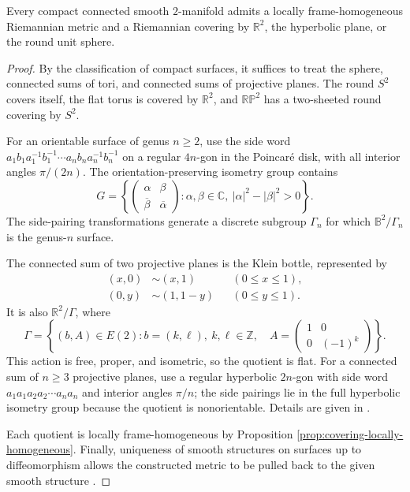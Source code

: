 \begin{theorem}
\label{thm:uniformization-compact-surfaces}
Every compact connected smooth $2$-manifold admits a locally
frame-homogeneous Riemannian metric and a Riemannian covering by
$\mathbb R^2$, the hyperbolic plane, or the round unit sphere.
\end{theorem}
\begin{proof}
\sketch By the classification of compact surfaces, it suffices to treat the
sphere, connected sums of tori, and connected sums of projective planes.
The round $S^2$ covers itself, the flat torus is covered by $\mathbb R^2$, and
$\mathbb{RP}^2$ has a two-sheeted round covering by $S^2$.

For an orientable surface of genus $n\ge2$, use the side word
$a_1b_1a_1^{-1}b_1^{-1}\cdots a_nb_na_n^{-1}b_n^{-1}$ on a regular
$4n$-gon in the Poincar\'e disk, with all interior angles $\pi/(2n)$. The
orientation-preserving isometry group contains
\begin{equation}
G=\left\{
\begin{pmatrix}\alpha&\beta\\\overline\beta&\overline\alpha\end{pmatrix}:
\alpha,\beta\in\mathbb C,\ |\alpha|^2-|\beta|^2>0
\right\}. \tag{3.18}
\end{equation}
The side-pairing transformations generate a discrete subgroup $\Gamma_n$ for
which $\mathbb B^2/\Gamma_n$ is the genus-$n$ surface.

The connected sum of two projective planes is the Klein bottle, represented by
\begin{equation}
\begin{aligned}
(x,0)&\sim(x,1) &&(0\le x\le1),\\
(0,y)&\sim(1,1-y) &&(0\le y\le1).
\end{aligned}
\tag{3.19}
\end{equation}
It is also $\mathbb R^2/\Gamma$, where
\begin{equation}
\Gamma=\left\{(b,A)\in E(2):
b=(k,\ell),\ k,\ell\in\mathbb Z,\quad
A=\begin{pmatrix}1&0\\0&(-1)^k\end{pmatrix}
\right\}. \tag{3.20}
\end{equation}
This action is free, proper, and isometric, so the quotient is flat. For a
connected sum of $n\ge3$ projective planes, use a regular hyperbolic $2n$-gon
with side word $a_1a_1a_2a_2\cdots a_na_n$ and interior angles $\pi/n$; the
side pairings lie in the full hyperbolic isometry group because the quotient is
nonorientable. Details are given in \cite{Ive92}.

Each quotient is locally frame-homogeneous by Proposition
\ref{prop:covering-locally-homogeneous}. Finally, uniqueness of smooth
structures on surfaces up to diffeomorphism allows the constructed metric to
be pulled back to the given smooth structure \cite{Mun56}.
\end{proof}

